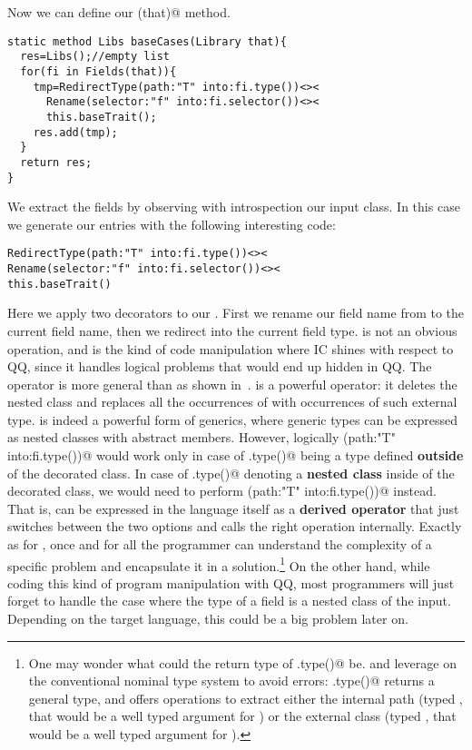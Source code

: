 \noindent
Now we can define our \Q@baseCases(that)@ method.

\begin{lstlisting}
static method Libs baseCases(Library that){
  res=Libs();//empty list
  for(fi in Fields(that)){
    tmp=RedirectType(path:"T" into:fi.type())<><
      Rename(selector:"f" into:fi.selector())<><
      this.baseTrait();
    res.add(tmp);
  }
  return res;
}
\end{lstlisting}

\noindent
We extract the fields by observing with introspection
our input class.
In this case we generate our entries with the following interesting code:

\begin{lstlisting}
RedirectType(path:"T" into:fi.type())<><
Rename(selector:"f" into:fi.selector())<><
this.baseTrait()
\end{lstlisting}

\noindent Here we apply two decorators to our \Q@baseTrait@. First
we rename our field name from \Q@f@ to the current field name, then
 we redirect \Q@T@ into the current field type.
 \Q@RedirectType@ is not an obvious operation, and is the kind of code manipulation where IC shines
with respect to QQ, since it handles logical problems that would end up hidden in QQ.
 The operator \Q@RedirectType@ is more general than \Q@Redirect@ as shown in~\cite{servetto2014meta}.
 \Q@Redirect@ is a powerful operator:
 it deletes the nested class \Q@T@ and replaces all
 the occurrences of \Q@T@ with occurrences of such external type.
 \Q@Redirect@ is indeed a powerful form of generics,
 where generic types can be expressed as nested classes with abstract members.
 However, logically \Q@Redirect(path:"T" into:fi.type())@
 would work only in case of \Q@fi.type()@ being a type
 defined \textbf{outside} of the decorated class.
 In case of \Q@fi.type()@ denoting a \textbf{nested class} inside of the decorated class,
 we would need to perform \Q@Rename(path:"T" into:fi.type())@ instead.
 That is,
 \Q@RedirectType@ can be expressed in the language itself as a \textbf{derived operator}
 that just switches between the two options and calls the right operation internally.
Exactly as  for \Q@Stringable@, once and for all the programmer can understand
 the complexity of a specific problem and encapsulate it in a solution.\footnote{
One may wonder what could the return type of \Q@fi.type()@
be. \Q@Rename@ and \Q@Redirect@ leverage on the
conventional nominal type system to avoid errors:
 \Q@fi.type()@ returns a general \Q@Type@ type, and offers operations to extract either
 the internal path (typed \Q@Path@, that would be a well typed argument for \Q@Rename@)
 or the external class (typed \Q@Class@, that would be a well typed argument for \Q@Redirect@).}
 On the other hand, while coding this kind of program manipulation with QQ, most programmers
 will just forget to handle the case where the type of a field is a nested class of the input.
 Depending on the target language, this could be a big problem later on.


